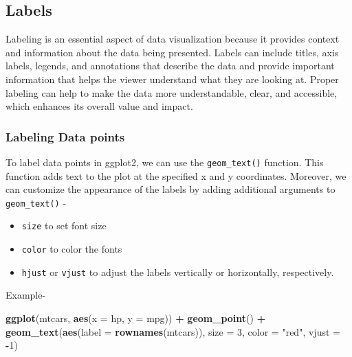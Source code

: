\documentclass[
]{book}
\newenvironment{Shaded}{\begin{snugshade}}{\end{snugshade}}
\newcommand{\AttributeTok}[1]{\textcolor[rgb]{0.13,0.29,0.53}{#1}}
\newcommand{\DecValTok}[1]{\textcolor[rgb]{0.00,0.00,0.81}{#1}}
\newcommand{\FunctionTok}[1]{\textcolor[rgb]{0.13,0.29,0.53}{\textbf{#1}}}
\newcommand{\NormalTok}[1]{#1}
\newcommand{\SpecialCharTok}[1]{\textcolor[rgb]{0.81,0.36,0.00}{\textbf{#1}}}
\newcommand{\StringTok}[1]{\textcolor[rgb]{0.31,0.60,0.02}{#1}}
\providecommand{\tightlist}{%
  \setlength{\itemsep}{0pt}\setlength{\parskip}{0pt}}
\begin{document}
\hypertarget{labels}{%
\subsection{Labels}\label{labels}}

Labeling is an essential aspect of data visualization because it provides context and information about the data being presented. Labels can include titles, axis labels, legends, and annotations that describe the data and provide important information that helps the viewer understand what they are looking at. Proper labeling can help to make the data more understandable, clear, and accessible, which enhances its overall value and impact.

\hypertarget{labeling-data-points}{%
\subsubsection{Labeling Data points}\label{labeling-data-points}}

To label data points in ggplot2, we can use the \texttt{geom\_text()} function. This function adds text to the plot at the specified x and y coordinates. Moreover, we can customize the appearance of the labels by adding additional arguments to \texttt{geom\_text()} -

\begin{itemize}
\tightlist
\item
  \texttt{size} to set font size
\item
  \texttt{color} to color the fonts
\item
  \texttt{hjust} or \texttt{vjust} to adjust the labels vertically or horizontally, respectively.
\end{itemize}

Example-

\begin{Shaded}
\begin{Highlighting}[]
\FunctionTok{ggplot}\NormalTok{(mtcars, }\FunctionTok{aes}\NormalTok{(}\AttributeTok{x =}\NormalTok{ hp, }\AttributeTok{y =}\NormalTok{ mpg)) }\SpecialCharTok{+}
  \FunctionTok{geom\_point}\NormalTok{() }\SpecialCharTok{+}
  \FunctionTok{geom\_text}\NormalTok{(}\FunctionTok{aes}\NormalTok{(}\AttributeTok{label =} \FunctionTok{rownames}\NormalTok{(mtcars)),}
            \AttributeTok{size =} \DecValTok{3}\NormalTok{,}
            \AttributeTok{color =} \StringTok{"red"}\NormalTok{,}
            \AttributeTok{vjust =} \SpecialCharTok{{-}}\DecValTok{1}\NormalTok{)}
\end{Highlighting}
\end{Shaded}
\end{document}
